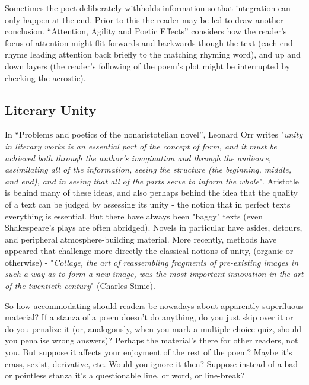 \documentclass[11pt]{article}
\begin{document}
Sometimes the poet deliberately withholds information so that integration can only happen at the end. Prior to this the reader
may be led to draw another conclusion. ``Attention, Agility and Poetic Effects'' considers how the reader's focus of attention might flit forwards and backwards though the text (each end-rhyme leading attention back briefly to the matching rhyming word), and up and down layers (the reader's following of the poem's plot might be interrupted by checking the acrostic).  

\subsection{Literary Unity}
In ``Problems and poetics of the nonaristotelian novel'', Leonard Orr writes "\textit{unity in literary works is an essential part of the concept of form, and it must be achieved both through the author's imagination and through the audience, assimilating all of the information, seeing the structure (the beginning, middle, and end), and in seeing that all of the parts serve to inform the whole}".
Aristotle is behind many of these ideas, and also perhaps behind the idea that the quality of a text can be judged by assessing its unity - the notion that in perfect texts everything is essential. But there have always been "baggy" texts (even Shakespeare's plays are often abridged). Novels in particular have asides, detours, and peripheral atmosphere-building material. More recently, methods have appeared that challenge more directly the classical notions of unity, (organic or otherwise) - "\textit{Collage, the art of reassembling fragments of pre-existing images in such a way as to form a new image, was the most important innovation in the art of the twentieth century}" (Charles Simic).

So how accommodating should readers be nowadays about apparently superfluous material? If a stanza of a poem doesn't do anything, do you just skip over it or do you penalize it (or, analogously, when you mark a multiple choice quiz, should you penalise wrong answers)? Perhaps the material's there for other readers, not you. But suppose it affects your enjoyment of the rest of the poem? Maybe it's crass, sexist, derivative, etc. Would you ignore it then? Suppose instead of a bad or pointless stanza it's a questionable line, or word, or line-break?
\end{document}
